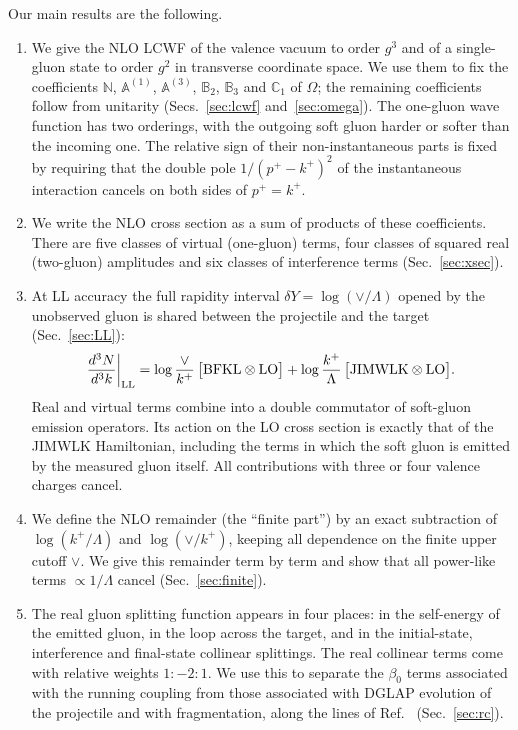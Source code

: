 \documentclass[aps,prd,onecolumn,superscriptaddress,nofootinbib,floatfix,longbibliography,11pt]{revtex4-2}
\numberwithin{equation}{section}
\def\mf#1{\mathbb{#1}}
\begin{document}
Our main results are the following.
\begin{enumerate}
\item We give the NLO LCWF of the valence vacuum to order $g^3$ and of a single-gluon state to order $g^2$ in transverse coordinate space. We use them to fix the coefficients $\mf N$, $\mf A^{(1)}$, $\mf A^{(3)}$, $\mf B_2$, $\mf B_3$ and $\mf C_1$ of $\Omega$; the remaining coefficients follow from unitarity (Secs.~\ref{sec:lcwf} and~\ref{sec:omega}). The one-gluon wave function has two orderings, with the outgoing soft gluon harder or softer than the incoming one. The relative sign of their non-instantaneous parts is fixed by requiring that the double pole $1/(p^+-k^+)^2$ of the instantaneous interaction cancels on both sides of $p^+=k^+$.
\item We write the NLO cross section as a sum of products of these coefficients. There are five classes of virtual (one-gluon) terms, four classes of squared real (two-gluon) amplitudes and six classes of interference terms (Sec.~\ref{sec:xsec}).
\item At LL accuracy the full rapidity interval $\delta Y=\log(\vee/\Lambda)$ opened by the unobserved gluon is shared between the projectile and the target (Sec.~\ref{sec:LL}):
\begin{equation}
\frac{d^3N}{d^3k}\bigg|_{\rm LL}=\log\frac{\vee}{k^+}\,\big[{\rm BFKL}\otimes{\rm LO}\big]+\log\frac{k^+}{\Lambda}\,\big[{\rm JIMWLK}\otimes{\rm LO}\big].
\label{eq:intro-main}
\end{equation}
Real and virtual terms combine into a double commutator of soft-gluon emission operators. Its action on the LO cross section is exactly that of the JIMWLK Hamiltonian, including the terms in which the soft gluon is emitted by the measured gluon itself. All contributions with three or four valence charges cancel.
\item We define the NLO remainder (the ``finite part'') by an exact subtraction of $\log(k^+/\Lambda)$ and $\log(\vee/k^+)$, keeping all dependence on the finite upper cutoff $\vee$. We give this remainder term by term and show that all power-like terms $\propto1/\Lambda$ cancel (Sec.~\ref{sec:finite}).
\item The real gluon splitting function appears in four places: in the self-energy of the emitted gluon, in the loop across the target, and in the initial-state, interference and final-state collinear splittings. The real collinear terms come with relative weights $1:-2:1$. We use this to separate the $\beta_0$ terms associated with the running coupling from those associated with DGLAP evolution of the projectile and with fragmentation, along the lines of Ref.~\cite{Kovner:2023vsy} (Sec.~\ref{sec:rc}).
\end{enumerate}
\end{document}
